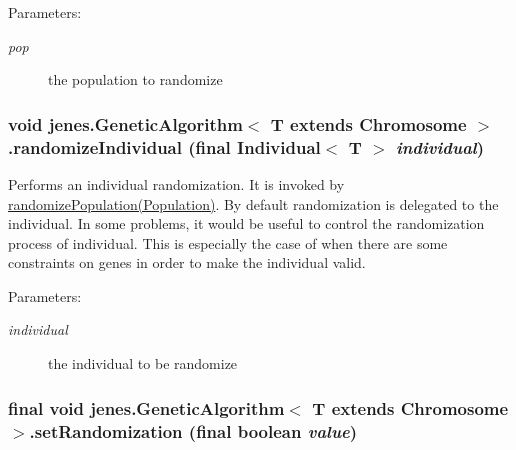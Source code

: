 \begin{Desc}
\item[Parameters:]
\begin{description}
\item[{\em pop}]the population to randomize \end{description}
\end{Desc}
\hypertarget{classjenes_1_1_genetic_algorithm_3_01_t_01extends_01_chromosome_01_4_7cefcc35bf6c98eb9b7c33c074b32d69}{
\subsubsection[randomizeIndividual]{\setlength{\rightskip}{0pt plus 5cm}void jenes.GeneticAlgorithm$<$ T extends Chromosome $>$.randomizeIndividual (final Individual$<$ T $>$ {\em individual})}}
\label{classjenes_1_1_genetic_algorithm_3_01_t_01extends_01_chromosome_01_4_7cefcc35bf6c98eb9b7c33c074b32d69}


Performs an individual randomization. It is invoked by \hyperlink{}{randomizePopulation(Population)}. By default randomization is delegated to the individual. In some problems, it would be useful to control the randomization process of individual. This is especially the case of when there are some constraints on genes in order to make the individual valid. 

\begin{Desc}
\item[Parameters:]
\begin{description}
\item[{\em individual}]the individual to be randomize \end{description}
\end{Desc}
\hypertarget{classjenes_1_1_genetic_algorithm_3_01_t_01extends_01_chromosome_01_4_cf14a43bc2c8bed69aa0334b18d58ba7}{
\subsubsection[setRandomization]{\setlength{\rightskip}{0pt plus 5cm}final void jenes.GeneticAlgorithm$<$ T extends Chromosome $>$.setRandomization (final boolean {\em value})}}
\label{classjenes_1_1_genetic_algorithm_3_01_t_01extends_01_chromosome_01_4_cf14a43bc2c8bed69aa0334b18d58ba7}


